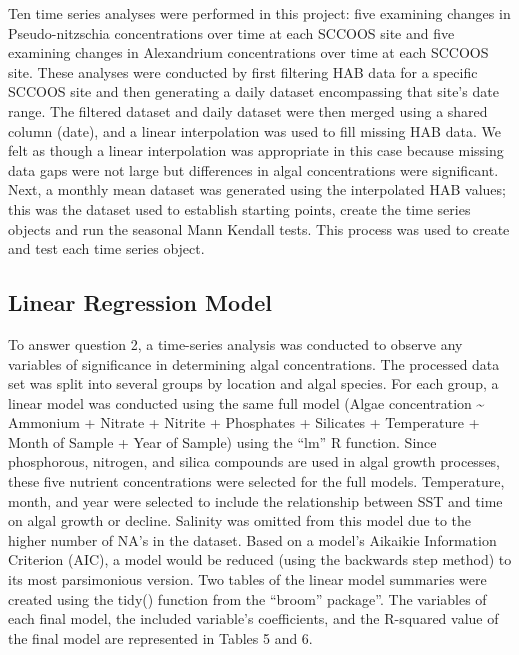 \documentclass[
  12pt,
]{article}
\begin{document}
Ten time series analyses were performed in this project: five examining
changes in Pseudo-nitzschia concentrations over time at each SCCOOS site
and five examining changes in Alexandrium concentrations over time at
each SCCOOS site. These analyses were conducted by first filtering HAB
data for a specific SCCOOS site and then generating a daily dataset
encompassing that site's date range. The filtered dataset and daily
dataset were then merged using a shared column (date), and a linear
interpolation was used to fill missing HAB data. We felt as though a
linear interpolation was appropriate in this case because missing data
gaps were not large but differences in algal concentrations were
significant. Next, a monthly mean dataset was generated using the
interpolated HAB values; this was the dataset used to establish starting
points, create the time series objects and run the seasonal Mann Kendall
tests. This process was used to create and test each time series object.

\hypertarget{linear-regression-model}{%
\subsection{Linear Regression Model}\label{linear-regression-model}}

To answer question 2, a time-series analysis was conducted to observe
any variables of significance in determining algal concentrations. The
processed data set was split into several groups by location and algal
species. For each group, a linear model was conducted using the same
full model (Algae concentration \textasciitilde{} Ammonium + Nitrate +
Nitrite + Phosphates + Silicates + Temperature + Month of Sample + Year
of Sample) using the ``lm'' R function. Since phosphorous, nitrogen, and
silica compounds are used in algal growth processes, these five nutrient
concentrations were selected for the full models. Temperature, month,
and year were selected to include the relationship between SST and time
on algal growth or decline. Salinity was omitted from this model due to
the higher number of NA's in the dataset. Based on a model's Aikaikie
Information Criterion (AIC), a model would be reduced (using the
backwards step method) to its most parsimonious version. Two tables of
the linear model summaries were created using the tidy() function from
the ``broom'' package''. The variables of each final model, the included
variable's coefficients, and the R-squared value of the final model are
represented in Tables 5 and 6.
\end{document}
